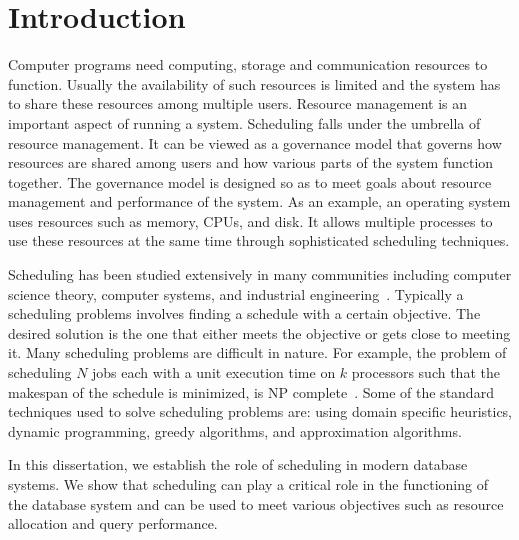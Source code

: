 \chapter{Introduction}
Computer programs need computing, storage and communication resources to function. 
Usually the availability of such resources is limited and the system has to share these resources among multiple users. 
Resource management is an important aspect of running a system.
Scheduling falls under the umbrella of resource management. 
It can be viewed as a governance model that governs how resources are shared among users and how various parts of the system function together. 
The governance model is designed so as to meet goals about resource management and performance of the system. 
As an example, an operating system uses resources such as memory, CPUs, and disk.
It allows multiple processes to use these resources at the same time through sophisticated scheduling techniques. 

Scheduling has been studied extensively in many communities including computer science theory, computer systems, and industrial engineering~\cite{Bouganim:1998:MSL:288627.288646, dist-based-scheduling,iCBS-SLA,  DBLP:conf/rtss/HaritsaLC91, DBLP:journals/csur/KwokA99, linn1999hybrid, pinedo2016scheduling, ULLMAN1975384, lottery-scheduling}. 
Typically a scheduling problems involves finding a schedule with a certain objective.
The desired solution is the one that either meets the objective or gets close to meeting it.
Many scheduling problems are difficult in nature.
For example, the problem of scheduling $N$ jobs each with a unit execution time on $k$ processors such that the makespan of the schedule is minimized, is NP complete~\cite{ULLMAN1975384}.
Some of the standard techniques used to solve scheduling problems are: using domain specific heuristics, dynamic programming, greedy algorithms, and approximation algorithms. 

In this dissertation, we establish the role of scheduling in modern database systems.
We show that scheduling can play a critical role in the functioning of the database system and can be used to meet various objectives such as resource allocation and query performance.

